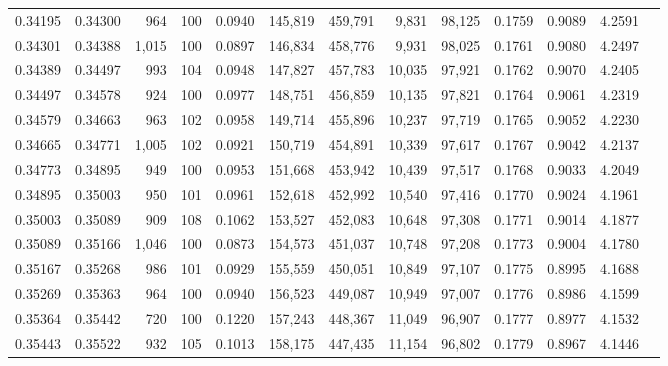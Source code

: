 \begin{tabular}{rrrrrrrrrrrrr}
0.34195 & 0.34300 &   964 & 100 &                                     0.0940 & 145,819 & 459,791 &   9,831 &  98,125 & 0.1759 & 0.9089 & 4.2591 \\
0.34301 & 0.34388 & 1,015 & 100 &                                     0.0897 & 146,834 & 458,776 &   9,931 &  98,025 & 0.1761 & 0.9080 & 4.2497 \\
0.34389 & 0.34497 &   993 & 104 &                                     0.0948 & 147,827 & 457,783 &  10,035 &  97,921 & 0.1762 & 0.9070 & 4.2405 \\
0.34497 & 0.34578 &   924 & 100 &                                     0.0977 & 148,751 & 456,859 &  10,135 &  97,821 & 0.1764 & 0.9061 & 4.2319 \\
0.34579 & 0.34663 &   963 & 102 &                                     0.0958 & 149,714 & 455,896 &  10,237 &  97,719 & 0.1765 & 0.9052 & 4.2230 \\
0.34665 & 0.34771 & 1,005 & 102 &                                     0.0921 & 150,719 & 454,891 &  10,339 &  97,617 & 0.1767 & 0.9042 & 4.2137 \\
0.34773 & 0.34895 &   949 & 100 &                                     0.0953 & 151,668 & 453,942 &  10,439 &  97,517 & 0.1768 & 0.9033 & 4.2049 \\
0.34895 & 0.35003 &   950 & 101 &                                     0.0961 & 152,618 & 452,992 &  10,540 &  97,416 & 0.1770 & 0.9024 & 4.1961 \\
0.35003 & 0.35089 &   909 & 108 &                                     0.1062 & 153,527 & 452,083 &  10,648 &  97,308 & 0.1771 & 0.9014 & 4.1877 \\
0.35089 & 0.35166 & 1,046 & 100 &                                     0.0873 & 154,573 & 451,037 &  10,748 &  97,208 & 0.1773 & 0.9004 & 4.1780 \\
0.35167 & 0.35268 &   986 & 101 &                                     0.0929 & 155,559 & 450,051 &  10,849 &  97,107 & 0.1775 & 0.8995 & 4.1688 \\
0.35269 & 0.35363 &   964 & 100 &                                     0.0940 & 156,523 & 449,087 &  10,949 &  97,007 & 0.1776 & 0.8986 & 4.1599 \\
0.35364 & 0.35442 &   720 & 100 &                                     0.1220 & 157,243 & 448,367 &  11,049 &  96,907 & 0.1777 & 0.8977 & 4.1532 \\
0.35443 & 0.35522 &   932 & 105 &                                     0.1013 & 158,175 & 447,435 &  11,154 &  96,802 & 0.1779 & 0.8967 & 4.1446 \\

\end{tabular}
